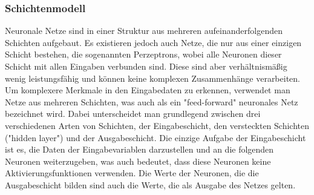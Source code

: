 \subsubsection{Schichtenmodell}\label{subsec:neuronen:schichtenmodell}
Neuronale Netze sind in einer Struktur aus mehreren aufeinanderfolgenden Schichten aufgebaut.
Es existieren jedoch auch Netze, die nur aus einer einzigen Schicht bestehen, die sogenannten Perzeptrons, wobei alle Neuronen dieser Schicht mit allen Eingaben verbunden sind.
Diese sind aber verhältnismäßig wenig leistungsfähig und können keine komplexen Zusammenhänge verarbeiten.
Um komplexere Merkmale in den Eingabedaten zu erkennen, verwendet man Netze aus mehreren Schichten, was auch als ein "feed-forward" neuronales Netz bezeichnet wird.
Dabei unterscheidet man grundlegend zwischen drei verschiedenen Arten von Schichten, der Eingabeschicht, den versteckten Schichten ("hidden layer") und der Ausgabeschicht.
Die einzige Aufgabe der Eingabeschicht ist es, die Daten der Eingabevariablen darzustellen und an die folgenden Neuronen weiterzugeben, was auch bedeutet, dass diese Neuronen keine Aktivierungsfunktionen verwenden.
Die Werte der Neuronen, die die Ausgabeschicht bilden sind auch die Werte, die als Ausgabe des Netzes gelten.
